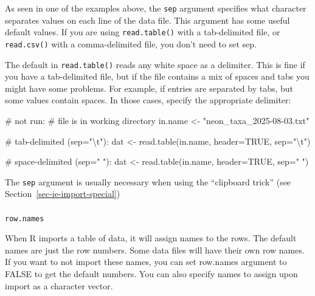 \documentclass[
  13,
  letterpaper,
]{report}
\makeatletter
\let\oldparagraph\paragraph
\renewcommand{\paragraph}{
    \@ifstar
      \xxxParagraphStar
      \xxxParagraphNoStar
  }
\newcommand{\xxxParagraphStar}[1]{\oldparagraph*{#1}\mbox{}}
\newcommand{\xxxParagraphNoStar}[1]{\oldparagraph{#1}\mbox{}}
\newenvironment{Shaded}{\begin{snugshade}}{\end{snugshade}}
\newcommand{\AttributeTok}[1]{\textcolor[rgb]{0.40,0.45,0.13}{#1}}
\newcommand{\CommentTok}[1]{\textcolor[rgb]{0.37,0.37,0.37}{#1}}
\newcommand{\ConstantTok}[1]{\textcolor[rgb]{0.56,0.35,0.01}{#1}}
\newcommand{\FunctionTok}[1]{\textcolor[rgb]{0.28,0.35,0.67}{#1}}
\newcommand{\NormalTok}[1]{\textcolor[rgb]{0.00,0.23,0.31}{#1}}
\newcommand{\OtherTok}[1]{\textcolor[rgb]{0.00,0.23,0.31}{#1}}
\newcommand{\SpecialCharTok}[1]{\textcolor[rgb]{0.37,0.37,0.37}{#1}}
\newcommand{\StringTok}[1]{\textcolor[rgb]{0.13,0.47,0.30}{#1}}
\makeatother
\begin{document}
As seen in one of the examples above, the \texttt{sep} argument
specifies what character separates values on each line of the data file.
This argument has some useful default values. If you are using
\texttt{read.table()} with a tab-delimited file, or \texttt{read.csv()}
with a comma-delimited file, you don't need to set sep.

The default in \texttt{read.table()} reads any white space as a
delimiter. This is fine if you have a tab-delimited file, but if the
file contains a mix of spaces and tabs you might have some problems. For
example, if entries are separated by tabs, but some values contain
spaces. In those cases, specify the appropriate delimiter:

\begin{Shaded}
\begin{Highlighting}[]
\CommentTok{\# not run:}
\CommentTok{\# file is in working directory}
\NormalTok{in.name }\OtherTok{\textless{}{-}} \StringTok{"neon\_taxa\_2025{-}08{-}03.txt"}

\CommentTok{\# tab{-}delimited (sep="\textbackslash{}t"):}
\NormalTok{dat }\OtherTok{\textless{}{-}} \FunctionTok{read.table}\NormalTok{(in.name, }\AttributeTok{header=}\ConstantTok{TRUE}\NormalTok{, }\AttributeTok{sep=}\StringTok{"}\SpecialCharTok{\textbackslash{}t}\StringTok{"}\NormalTok{)}

\CommentTok{\# space{-}delimited (sep=" "): }
\NormalTok{dat }\OtherTok{\textless{}{-}} \FunctionTok{read.table}\NormalTok{(in.name, }\AttributeTok{header=}\ConstantTok{TRUE}\NormalTok{, }\AttributeTok{sep=}\StringTok{" "}\NormalTok{)}
\end{Highlighting}
\end{Shaded}

The \texttt{sep} argument is usually necessary when using the
``clipboard trick'' (see Section~\ref{sec-ie-import-special})

\paragraph{\texorpdfstring{\texttt{row.names}}{row.names}}\label{row.names}

When R imports a table of data, it will assign names to the rows. The
default names are just the row numbers. Some data files will have their
own row names. If you want to not import these names, you can set
row.names argument to FALSE to get the default numbers. You can also
specify names to assign upon import as a character vector.
\end{document}
